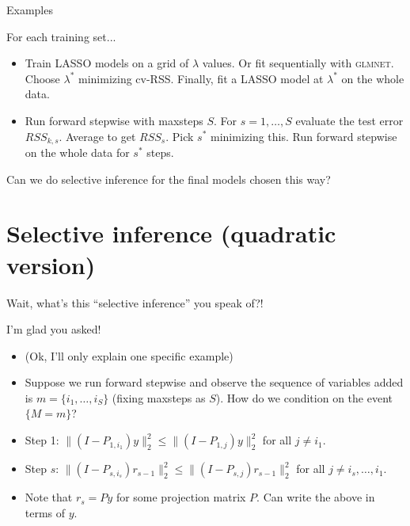 \documentclass{beamer}
\begin{document}
\begin{frame}{Examples}
  
  For each training set...

  \begin{itemize}

  \item Train LASSO models on a grid of $\lambda$ values. Or fit
    sequentially with \textsc{glmnet}. Choose $\lambda^*$ minimizing
    cv-RSS. Finally, fit a LASSO model at $\lambda^*$ on the
    whole data. 

  \item Run forward stepwise with maxsteps $S$. For $s = 1,\ldots,
    S$ evaluate the test error $RSS_{k,s}$. Average to
    get $RSS_s$. Pick $s^*$ minimizing this. Run forward stepwise on the
    whole data for $s^*$ steps. 

  \end{itemize}

  Can we do selective inference for the final models chosen this way?

\end{frame}

\section{Selective inference (quadratic version)}
\label{sec:quadratic}

\begin{frame}{Wait, what's this ``selective inference'' you speak of?!}
  
  I'm glad you asked! 

  \begin{itemize}

  \item (Ok, I'll only explain one specific example)

  \item Suppose we run forward stepwise and observe the sequence of
    variables added is $m = \{ i_1, \ldots, i_S \}$ (fixing
    maxsteps as $S$). How do we condition on the event $\{ M = m \}$? 
    
  \item Step 1: $\| (I - P_{1,i_1})y \|_2^2 \leq \|(I - P_{1,j})y \|_2^2$
    for all $j \neq i_1$.

  \item Step $s$: $\| (I - P_{s,i_s})r_{s-1} \|_2^2 \leq \| (I -
    P_{s,j})r_{s-1} \|_2^2$ for all $j \neq i_s, \ldots, i_1$. 

  \item Note that $r_s = P y$ for some projection matrix $P$. Can write the above in terms of $y$.

  \end{itemize}

\end{frame}
\end{document}
